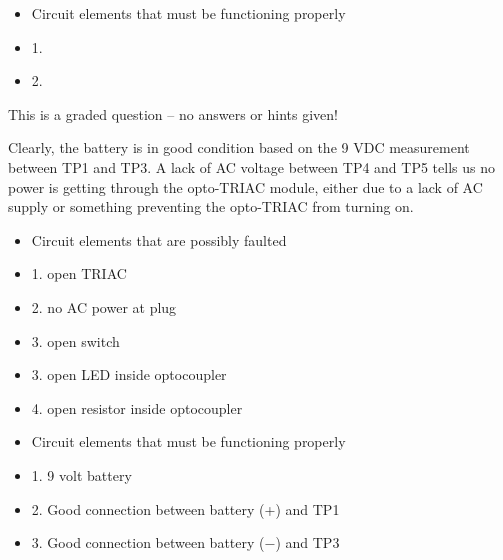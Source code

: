 \begin{itemize}
\item{} Circuit elements that must be functioning properly
\item{1.} 
\item{2.} 
\end{itemize}

\vfil 

\eject






This is a graded question -- no answers or hints given!







Clearly, the battery is in good condition based on the 9 VDC measurement between TP1 and TP3.  A lack of AC voltage between TP4 and TP5 tells us no power is getting through the opto-TRIAC module, either due to a lack of AC supply or something preventing the opto-TRIAC from turning on.

\begin{itemize}
\item{} Circuit elements that are possibly faulted
\item{1.} open TRIAC 
\item{2.} no AC power at plug
\item{3.} open switch
\item{3.} open LED inside optocoupler
\item{4.} open resistor inside optocoupler
\end{itemize}

\begin{itemize}
\item{} Circuit elements that must be functioning properly
\item{1.} 9 volt battery
\item{2.} Good connection between battery (+) and TP1
\item{3.} Good connection between battery ($-$) and TP3
\end{itemize}




